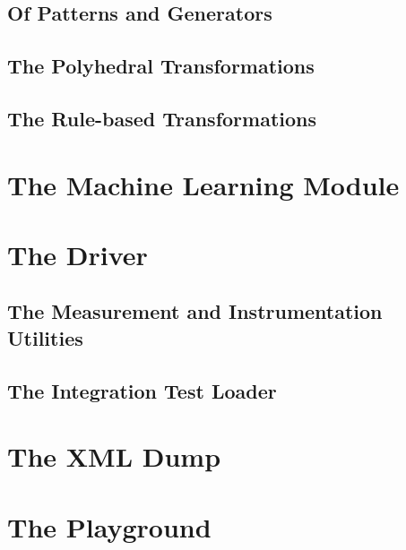 \subsection{Of Patterns and Generators}
\subsection{The Polyhedral Transformations}
\subsection{The Rule-based Transformations}

\section{The Machine Learning Module}
\section{The Driver}
\subsection{The Measurement and Instrumentation Utilities}
\subsection{The Integration Test Loader}

\section{The XML Dump}
\section{The Playground}
